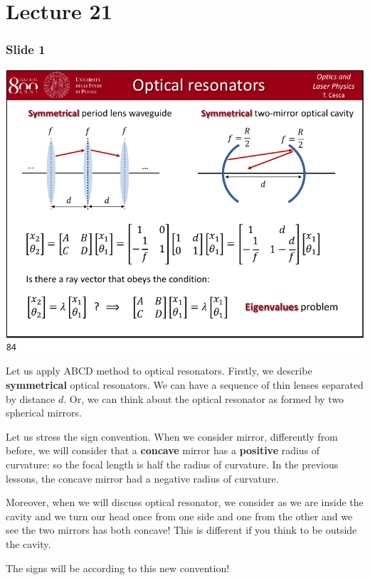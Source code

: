 \documentclass[../main/main.tex]{subfiles}
\begin{document}
\pagestyle{plain}

\section{Lecture 21}


\subsubsection*{Slide 1}

\begin{minipage}[]{0.5\linewidth}
\centering
\includegraphics[page=1,width=1\textwidth]{../lessons/pdf_file/21_lecture.pdf}
\end{minipage}
\hspace{0.3cm}\vspace{0.3cm}
\begin{minipage}[c]{0.47\linewidth}

Let us apply ABCD method to optical resonators. Firstly, we describe \textbf{symmetrical} optical resonators. We can have a sequence of thin lenses separated by distance \( d \).
Or, we can think about the optical resonator as formed by two spherical mirrors.

Let us stress the sign convention. When we consider mirror, differently from before, we will consider that a \textbf{concave} mirror has a \textbf{positive} radius of curvature: so the focal length is half the radius of curvature. In the previous lessons, the concave mirror had a negative radius of curvature.

Moreover, when we will discuss optical resonator, we consider as we are inside the cavity and we turn our head once from one side and one from the other and we see the two mirrors has both concave! This is different if you think to be outside the cavity.

The signs will be according to this new convention!

\end{minipage}
\end{document}
